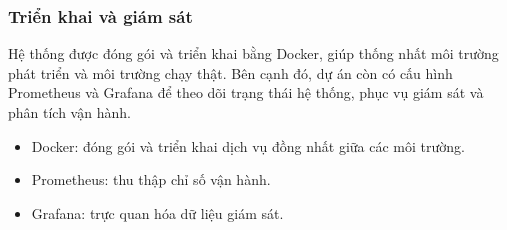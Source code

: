 \subsubsection{Triển khai và giám sát}
Hệ thống được đóng gói và triển khai bằng Docker, giúp thống nhất môi trường phát triển và môi trường chạy thật. Bên cạnh đó, dự án còn có cấu hình Prometheus và Grafana để theo dõi trạng thái hệ thống, phục vụ giám sát và phân tích vận hành.

\begin{itemize}
    \item Docker: đóng gói và triển khai dịch vụ đồng nhất giữa các môi trường.
    \item Prometheus: thu thập chỉ số vận hành.
    \item Grafana: trực quan hóa dữ liệu giám sát.
\end{itemize}

\clearpage
